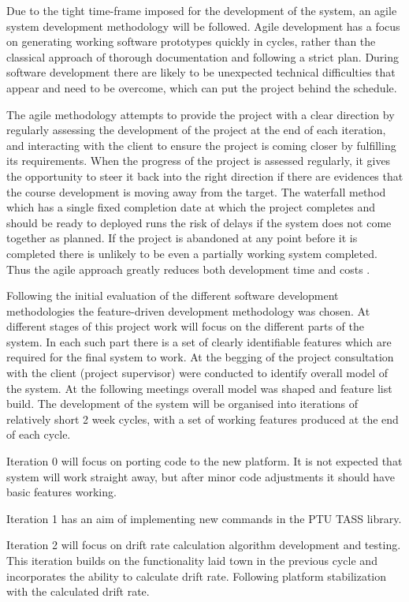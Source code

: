 Due to the tight time-frame imposed for the development of the system, an agile system development methodology will be followed. Agile development has a focus on generating working software prototypes quickly in cycles, rather than the classical approach of thorough documentation and following a strict plan. During software development there are likely to be unexpected technical difficulties that appear and need to be overcome, which can put the project behind the schedule.

The agile methodology attempts to provide the project with a clear direction by regularly assessing the development of the project at the end of each iteration, and interacting with the client to ensure the project is coming closer by fulfilling its requirements. When the progress of the project is assessed regularly, it gives the opportunity to steer it back into the right direction if there are evidences that the course development is moving away from the
target. The waterfall method which has a single fixed completion date at which the project completes and should be ready to deployed runs the risk of delays if the system does not come together as planned. If the project is abandoned at any point before it is completed there is unlikely to be even a partially working system completed. Thus the agile approach greatly reduces both development time and costs \cite{AgileManifesto}.

Following the initial evaluation of the different software development methodologies the feature-driven development methodology was chosen. At different stages of this project work will focus on the different parts of the system. In each such part there is a set of clearly identifiable features which are required for the final system to work. At the begging of the project consultation with the client (project supervisor) were conducted to identify overall model of the system. At the following meetings overall model was shaped and feature list build. The development of the system will be organised into iterations of relatively short 2 week cycles, with a set of working features produced at the end of each cycle.

Iteration 0 will focus on porting code to the new platform. It is not expected that system will work straight away, but after minor code adjustments it should have basic features working.

Iteration 1 has an aim of implementing new commands in the PTU TASS library.

Iteration 2 will focus on drift rate calculation algorithm development and testing. This iteration builds on the functionality laid town in the previous cycle and incorporates the ability to calculate drift rate. Following platform stabilization with the calculated drift rate. 

